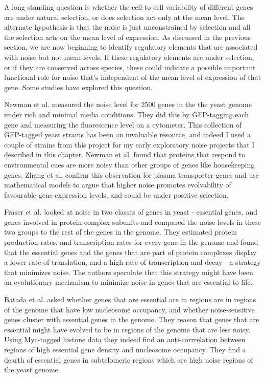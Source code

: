 A long-standing question is whether the cell-to-cell variability of different genes are under natural selection, or does selection act only at the mean level. The alternate hypothesis is that the noise is just unconstrained by selection and all the selection acts on the mean level of expression. As discussed in the previous section, we are now beginning to identify regulatory elements that are associated with noise but not mean levels. If these regulatory elements are under selection, or if they are conserved across species, these could indicate a possible important functional role for noise that's independent of the mean level of expression of that gene. Some studies have explored this question.

Newman et al. \cite{Newman} measured the noise level for 2500 genes in the the yeast genome under rich and minimal media conditions. They did this by GFP-tagging each gene and measuring the fluorescence level on a cytometer. This collection of GFP-tagged yeast strains has been an invaluable resource, and indeed I used a couple of strains from this project for my early exploratory noise projects that I described in this chapter. Newman et al. found that proteins that respond to environmental cues are more noisy than other groups of genes like housekeeping genes. Zhang et al. \cite{Zhang} confirm this observation for plasma transporter genes and use mathematical models to argue that higher noise promotes evolvability of favourable gene expression levels, and could be under positive selection. 

Fraser et al. \cite{Fraser} looked at noise in two classes of genes in yeast - essential genes, and genes involved in protein complex subunits and compared the noise levels in these two groups to the rest of the genes in the genome. They estimated protein production rates, and transcription rates for every gene in the genome and found that the essential genes and the genes that are part of protein complexes display a lower rate of translation, and a high rate of transcription and decay - a strategy that minimizes noise. The authors speculate that this strategy might have been an evolutionary mechanism to minimize noise in genes that are essential to life.

Batada et al. \cite{Batada} asked whether genes that are essential are in regions are in regions of the genome that have low nucleosome occupancy, and whether noise-sensitive genes cluster with essential genes in the genome. They reason that genes that are essential might have evolved to be in regions of the genome that are less noisy. Using Myc-tagged histone data they indeed find an anti-corrrelation between regions of high essential gene density and nucleosome occupancy. They find a dearth of essential genes in subtelomeric regions which are high noise regions of the yeast genome.

